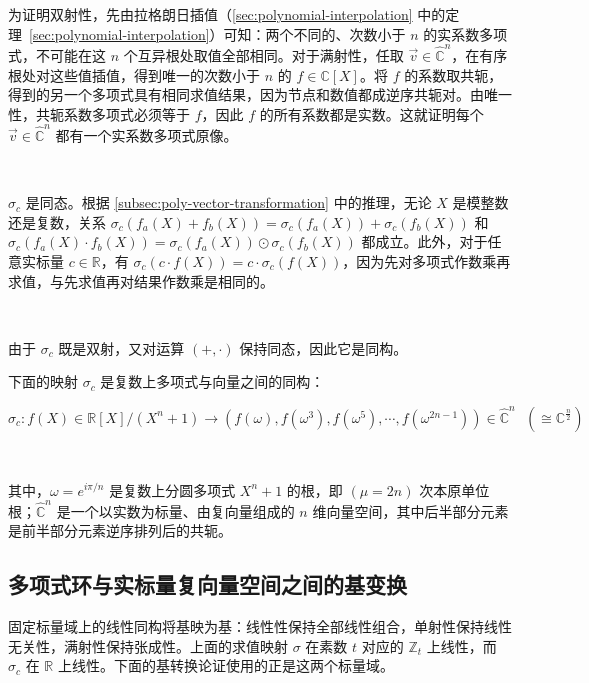 为证明双射性，先由拉格朗日插值（\autoref{sec:polynomial-interpolation} 中的定理~\ref*{sec:polynomial-interpolation}）可知：两个不同的、次数小于 $n$ 的实系数多项式，不可能在这 $n$ 个互异根处取值全部相同。对于满射性，任取 $\vec v\in\hat{\mathbb C}^n$，在有序根处对这些值插值，得到唯一的次数小于 $n$ 的 $f\in\mathbb C[X]$。将 $f$ 的系数取共轭，得到的另一个多项式具有相同求值结果，因为节点和数值都成逆序共轭对。由唯一性，共轭系数多项式必须等于 $f$，因此 $f$ 的所有系数都是实数。这就证明每个 $\vec v\in\hat{\mathbb C}^n$ 都有一个实系数多项式原像。

$ $

$\sigma_c$ 是同态。根据 \autoref{subsec:poly-vector-transformation} 中的推理，无论 $X$ 是模整数还是复数，关系 $\sigma_c(f_a(X) + f_b(X)) = \sigma_c(f_a(X)) + \sigma_c(f_b(X))$ 和 $\sigma_c(f_a(X) \cdot f_b(X)) = \sigma_c(f_a(X)) \odot \sigma_c(f_b(X))$ 都成立。此外，对于任意实标量 $c \in \mathbb{R}$，有 $\sigma_c(c \cdot f(X)) = c \cdot \sigma_c(f(X))$，因为先对多项式作数乘再求值，与先求值再对结果作数乘是相同的。

$ $

由于 $\sigma_c$ 既是双射，又对运算 $(+, \cdot)$ 保持同态，因此它是同构。


\begin{tcolorbox}[title={\textbf{\tboxtheorem{\ref*{subsec:poly-vector-transformation-complex}} 复数上多项式与向量之间的同构}}]

下面的映射 $\sigma_c$ 是复数上多项式与向量之间的同构：

$\sigma_c: f(X) \in \mathbb{R}[X]/(X^n + 1) \longrightarrow (f(\omega),f(\omega^3),f(\omega^5), \cdots, f(\omega^{2n-1})) \in \hat{\mathbb{C}}^{n} \text{ } (\cong \mathbb{C}^{\frac{n}{2}})$

$ $

其中，$\omega = e^{i\pi/n}$ 是复数上分圆多项式 $X^n + 1$ 的根，即 $(\mu=2n)$ 次本原单位根；$\hat{\mathbb{C}}^{n}$ 是一个以实数为标量、由复向量组成的 $n$ 维向量空间，其中后半部分元素是前半部分元素逆序排列后的共轭。

\end{tcolorbox}





\subsection{多项式环与实标量复向量空间之间的基变换}
\label{subsec:poly-vector-basis-transfer}


固定标量域上的线性同构将基映为基：线性性保持全部线性组合，单射性保持线性无关性，满射性保持张成性。上面的求值映射 $\sigma$ 在素数 $t$ 对应的 $\mathbb Z_t$ 上线性，而 $\sigma_c$ 在 $\mathbb R$ 上线性。下面的基转换论证使用的正是这两个标量域。

